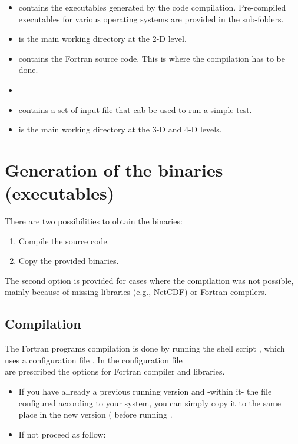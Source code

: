 \begin{itemize}
\item {} contains the executables generated by the code compilation. Pre-compiled executables for various operating systems are provided in the sub-folders.
\item {} is the main working directory at the 2-D level. 
\item {} contains the Fortran source code. This is where the compilation has to be done.
\item[]
\item {} contains a set of input file that cab be used to run a simple test.
\item {} is the main working directory at the 3-D and 4-D levels.
\end{itemize}

\section{Generation of the binaries (executables)}

There are two possibilities to obtain the binaries: 
\begin{enumerate}
\item Compile the source code.
\item Copy the provided binaries.
\end{enumerate}
The second option is provided for cases where the compilation was not possible, mainly because of missing libraries (e.g., NetCDF) or Fortran compilers.

\subsection{Compilation\label{sec:compilation}}

The \diva Fortran programs compilation is done by running the shell script , which uses a configuration file . In the configuration file \\  are prescribed the options for Fortran compiler and libraries.
\begin{itemize}
\item If you have allready a previous running \diva version and -within it- the file \\  configured according to your system, you can simply copy it to the same place in the new version ( before running  .
\item If not proceed as follow:
\end{itemize}


